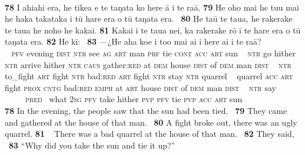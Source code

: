 {~

\bigskip\gll
\textbf{\textup{78}} I ahiahi era, he tike{\ꞌ}a e te taŋata ko here {\ꞌ}ā i te ra{\ꞌ}ā. \textbf{\textup{79}} He oho mai he tu{\ꞌ}u mai he haka takataka {\ꞌ}i tū hare era o tū taŋata era. ~\textbf{\textup{80}} He taū te tau{\ꞌ}a, he rakerake te tau{\ꞌ}a he noho he kakai. \textbf{\textup{81}} Kakai i te tau{\ꞌ}a nei, ka rakerake rō {\ꞌ}i te hare era o tū taŋata era. \textbf{\textup{82}} He kī: ~\textbf{\textup{83}} —¿He aha koe i to{\ꞌ}o mai ai i here ai i te ra{\ꞌ}ā?\\
~ \textsc{pfv} evening \textsc{dist} \textsc{ntr} see \textsc{ag} \textsc{art} man \textsc{prf} tie \textsc{cont} \textsc{acc} \textsc{art} sun  ~ \textsc{ntr} go hither \textsc{ntr} arrive hither \textsc{ntr} \textsc{caus} gather:\textsc{red} at \textsc{dem} house \textsc{dist} of \textsc{dem} man \textsc{dist} ~ \textsc{ntr} to\_fight \textsc{art} fight \textsc{ntr} bad:\textsc{red} \textsc{art} fight \textsc{ntr} stay \textsc{ntr} quarrel  ~ quarrel \textsc{acc} \textsc{art} fight \textsc{prox} \textsc{cntg} bad:\textsc{red} \textsc{emph} at \textsc{art} house \textsc{dist} of \textsc{dem} man \textsc{dist}  ~ \textsc{ntr} say ~ ~~~~~\textsc{pred}~ what \textsc{2sg} \textsc{pfv} take hither \textsc{pvp} \textsc{pfv} tie \textsc{pvp} \textsc{acc} \textsc{art} sun\\

\medskip\glt
\textbf{\textup{78}} In the evening, the people saw that the sun had been tied. ~\textbf{\textup{79}} They came and gathered at the house of that man. ~\textbf{\textup{80}} A fight broke out, there was an ugly quarrel. \textbf{\textup{81~~}}There was a bad quarrel at the house of that man. ~\textbf{\textup{82}} They said, ~\textbf{\textup{83}} “Why did you take the sun and tie it up?”


~

}
